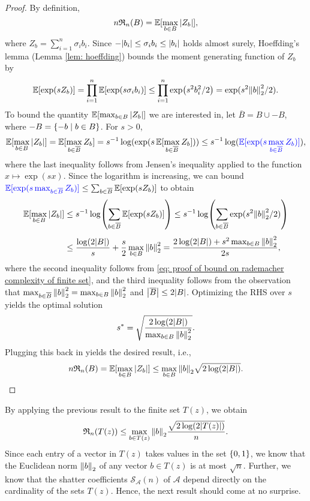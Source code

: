 \begin{proof}
By definition,
\[
    n \mathfrak{R}_n(B) = \operatorname{\mathbb{E}}[\max_{b \in B} \abs{Z_b}],
\]
where $Z_b = \sum_{i=1}^n \sigma_i b_i$. Since $-\abs{b_i} \leq \sigma_i b_i \leq \abs{b_i}$ holds almost surely, Hoeffding's lemma (Lemma \ref{lem: hoeffding}) bounds the moment generating function of $Z_b$ by
\begin{equation}
\label{eq: proof of bound on rademacher complexity of finite set}
    \operatorname{\mathbb{E}}[\exp(s Z_b)] = \prod_{i=1}^n \operatorname{\mathbb{E}}[\exp(s \sigma_i b_i)] \leq \prod_{i=1}^n \exp(s^2 b_i^2 / 2) = \operatorname{exp}(s^2 \norm{b}_2^2 / 2).
\end{equation}
To bound the quantity $\operatorname{\mathbb{E}}[\max_{b \in B} \abs{Z_b}]$ we are interested in, let $\overline{B} = B \cup -B$, where $-B = \set{-b \with b \in B}$. For $s>0$,
\[
    \operatorname{\mathbb{E}}[\max_{b \in B} \abs{Z_b}] = \operatorname{\mathbb{E}}[\max_{b \in \overline{B}} Z_b] = s^{-1} \operatorname{log}(\operatorname{exp}(s \operatorname{\mathbb{E}}[\max_{b \in \overline{B}} Z_b])) \leq s^{-1} \operatorname{log}({\color{blue} \operatorname{\mathbb{E}}[\operatorname{exp}(s \max_{b \in \overline{B}} Z_b)]}),
\]
where the last inequality follows from Jensen's inequality applied to the function $x \mapsto \exp(sx)$. Since the logarithm is increasing, we can bound ${\color{blue} \operatorname{\mathbb{E}}[\operatorname{exp}(s \max_{b \in \overline{B}} Z_b)]} \leq \sum_{b \in \overline{B}} \operatorname{\mathbb{E}}[\exp(s Z_b)]$ to obtain
\begin{align*}
    \operatorname{\mathbb{E}}[\max_{b \in B} \abs{Z_b}] &\leq s^{-1} \log(\sum_{b \in \overline{B}} \operatorname{\mathbb{E}}[\exp(s Z_b)]) \leq s^{-1} \log(\sum_{b \in \overline{B}} \operatorname{exp}(s^2 \norm{b}_2^2 / 2) ) \\[4pt]
    &\leq \frac{\log(2 \abs{B})}{s} + \frac{s}{2} \max_{b \in B} \norm{b}_2^2 = \frac{2 \log(2 \abs{B}) + s^2 \max_{b \in B} \norm{b}_2^2}{2s},
\end{align*}
where the second inequality follows from \eqref{eq: proof of bound on rademacher complexity of finite set}, and the third inequality follows from the observation that $\max_{b \in \overline{B}} \norm{b}_2^2 = \max_{b \in B} \norm{b}_2^2$ and $\abs{\overline{B}} \leq 2 \abs{B}$. Optimizing the RHS over $s$ yields the optimal solution
\[
    s^* = \sqrt{\frac{2 \log(2 \abs{B})}{\max_{b \in B} \norm{b}_2^2}}.
\]
Plugging this back in yields the desired result, i.e.,
\[
    n \mathfrak{R}_n(B) = \operatorname{\mathbb{E}}[\max_{b \in B} \abs{Z_b}] \leq \max_{b \in B} \norm{b}_2 \sqrt{2 \log(2 \abs{B})}. \qedhere
\]
\end{proof}

By applying the previous result to the finite set $T(z)$, we obtain
\[
    \mathfrak{R}_n(T(z)) \leq \max_{b \in T(z)} \norm{b}_2 \frac{\sqrt{2 \log(2 \abs{T(z)})}}{n}.
\]
Since each entry of a vector in $T(z)$ takes values in the set $\set{0, 1}$, we know that the Euclidean norm $\norm{b}_2$ of any vector $b \in T(z)$ is at most $\sqrt{n}$. Further, we know that the shatter coefficients $\mathcal{S}_{\mathcal{A}}(n)$ of $\mathcal{A}$ depend directly on the cardinality of the sets $T(z)$. Hence, the next result should come at no surprise.

